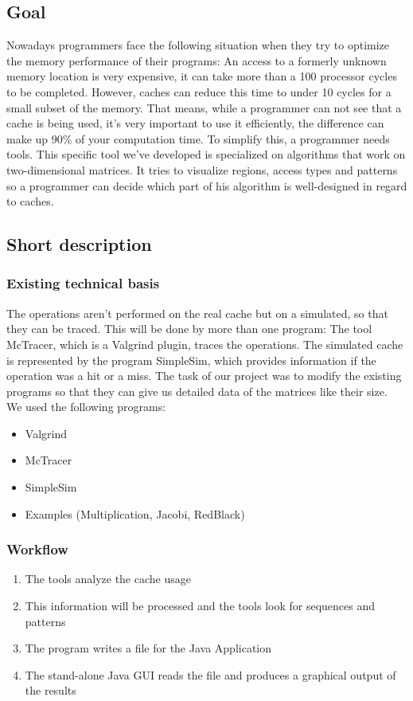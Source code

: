 \subsection{Goal}
Nowadays programmers face the following situation when they try to optimize the memory performance of their programs: An access to a formerly unknown memory location is very expensive, it can take more than a 100 processor cycles to be completed. However, caches can reduce this time to under 10 cycles for a small subset of the memory. That means, while a programmer can not see that a cache is being used, it's very important to use it efficiently, the difference can make up 90\% of your computation time.\newline
To simplify this, a programmer needs tools. This specific tool we've developed is specialized on algorithms that work on two-dimensional matrices. It tries to visualize regions, access types and patterns so a programmer can decide which part of his algorithm is well-designed in regard to caches.

\subsection{Short description}
\subsubsection{Existing technical basis}
The operations aren't performed on the real cache but on a simulated, so that they can be traced. This will be done by more than one program: The tool McTracer, which is a Valgrind plugin, traces the operations. The simulated cache is represented by the program SimpleSim, which provides information if the operation was a hit or a miss. The task of our project was to modify the existing programs so that they can give us detailed data of the matrices like their size.
\\

We used the following programs:
\begin{itemize}
\item Valgrind
\item McTracer
\item SimpleSim
\item Examples (Multiplication, Jacobi, RedBlack)
\end{itemize}

\subsubsection{Workflow}
\begin{enumerate}
\item The tools analyze the cache usage
\item This information will be processed and the tools look for sequences and patterns
\item The program writes a file for the Java Application
\item The stand-alone Java GUI reads the file and produces a graphical output of the results
\end{enumerate}

